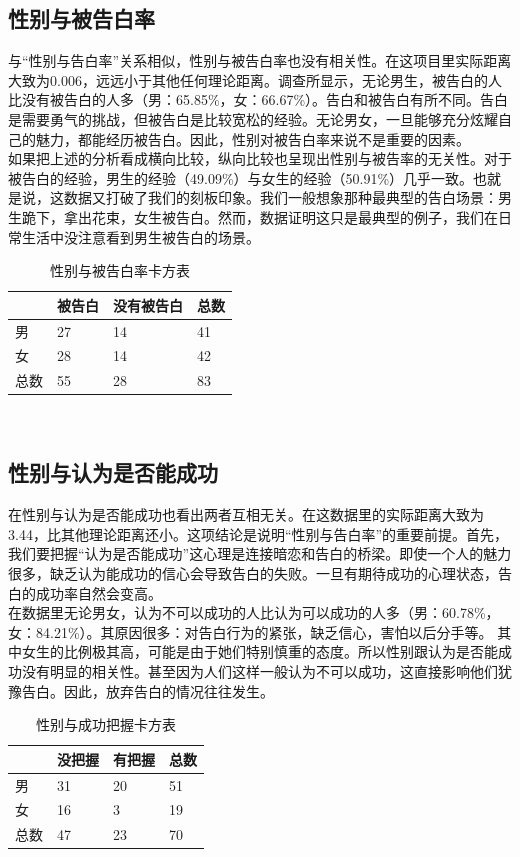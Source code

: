 \documentclass[10pt, a4paper, twocolumn]{ctexart}
\begin{document}
\subsection{性别与被告白率}
与“性别与告白率”关系相似，性别与被告白率也没有相关性。在这项目里实际距离大致为0.006，远远小于其他任何理论距离。调查所显示，无论男生，被告白的人比没有被告白的人多（男：65.85\%，女：66.67\%）。告白和被告白有所不同。告白是需要勇气的挑战，但被告白是比较宽松的经验。无论男女，一旦能够充分炫耀自己的魅力，都能经历被告白。因此，性别对被告白率来说不是重要的因素。\\
\indent 如果把上述的分析看成横向比较，纵向比较也呈现出性别与被告率的无关性。对于被告白的经验，男生的经验（49.09\%）与女生的经验（50.91\%）几乎一致。也就是说，这数据又打破了我们的刻板印象。我们一般想象那种最典型的告白场景：男生跪下，拿出花束，女生被告白。然而，数据证明这只是最典型的例子，我们在日常生活中没注意看到男生被告白的场景。
\begin{table}[htbp]
	\small
	\caption{性别与被告白率卡方表}
	\centering
	\begin{tabular}{llll}
		 & 被告白 & 没有被告白 & 总数 \\
		\midrule
		男&27&14&41 \\
		女&28&14&42 \\
		\midrule
		总数&55&28&83\\
		\bottomrule
	\end{tabular}
\end{table}
\\
\subsection{性别与认为是否能成功}
在性别与认为是否能成功也看出两者互相无关。在这数据里的实际距离大致为3.44，比其他理论距离还小。这项结论是说明“性别与告白率”的重要前提。首先，我们要把握“认为是否能成功”这心理是连接暗恋和告白的桥梁。即使一个人的魅力很多，缺乏认为能成功的信心会导致告白的失败。一旦有期待成功的心理状态，告白的成功率自然会变高。\\
\indent 在数据里无论男女，认为不可以成功的人比认为可以成功的人多（男：60.78\%，女：84.21\%）。其原因很多：对告白行为的紧张，缺乏信心，害怕以后分手等。 其中女生的比例极其高，可能是由于她们特别慎重的态度。所以性别跟认为是否能成功没有明显的相关性。甚至因为人们这样一般认为不可以成功，这直接影响他们犹豫告白。因此，放弃告白的情况往往发生。\\
\begin{table}[htbp]
	\small
	\caption{性别与成功把握卡方表}
	\centering
	\begin{tabular}{llll}
		 & 没把握 & 有把握 & 总数 \\
		\midrule
		男&31&20&51 \\
		女&16&3&19 \\
		\midrule
		总数&47&23&70\\
		\bottomrule
	\end{tabular}
\end{table}
\\
\end{document}
